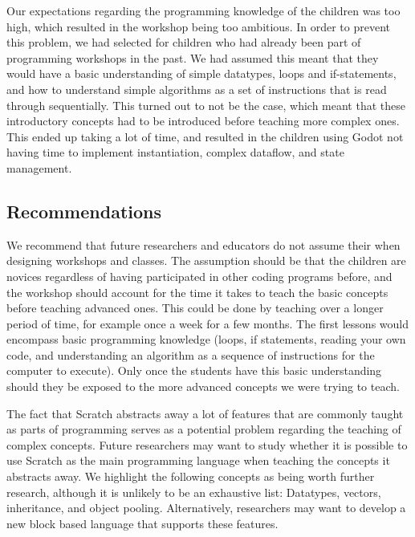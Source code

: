 Our expectations regarding the programming knowledge of the children was too high, which
resulted in the workshop being too ambitious. In order to prevent this problem, we had selected for children who had already been part of programming workshops in the past.
We had assumed this meant that they would have a basic
understanding of simple datatypes, loops and if-statements, and how
to understand simple algorithms as a set of instructions that is read
through sequentially.
This turned out to not be the case, which meant
that these introductory concepts had to be introduced before teaching
more complex ones.
This ended up taking a lot of time, and resulted
in the children using Godot not having time to implement
instantiation, complex dataflow, and state management.

\subsection{Recommendations}


We recommend that
future researchers and educators do not assume their when
designing workshops and classes.
The assumption should be that the
children are novices regardless of having participated in other
coding programs before, and the workshop should account for the time
it takes to teach the basic concepts before teaching advanced ones.
This could be done by teaching over a longer period of time, for
example once a week for a few months.
The first lessons would
encompass basic programming knowledge (loops, if statements, reading
your own code, and understanding an algorithm as a sequence of
instructions for the computer to execute).
Only once the students
have this basic understanding should they be exposed to the more
advanced concepts we were trying to teach.

The fact that Scratch abstracts away a lot of features that are commonly taught as parts of programming serves as a potential problem regarding the teaching of complex concepts. Future researchers may want to study whether it is possible to use Scratch as the main programming language when teaching the concepts it abstracts away. We highlight the following concepts as being worth further research, although it is unlikely to be an exhaustive list: Datatypes, vectors, inheritance, and object pooling. Alternatively, researchers may want to develop a new block based language that supports these features.



